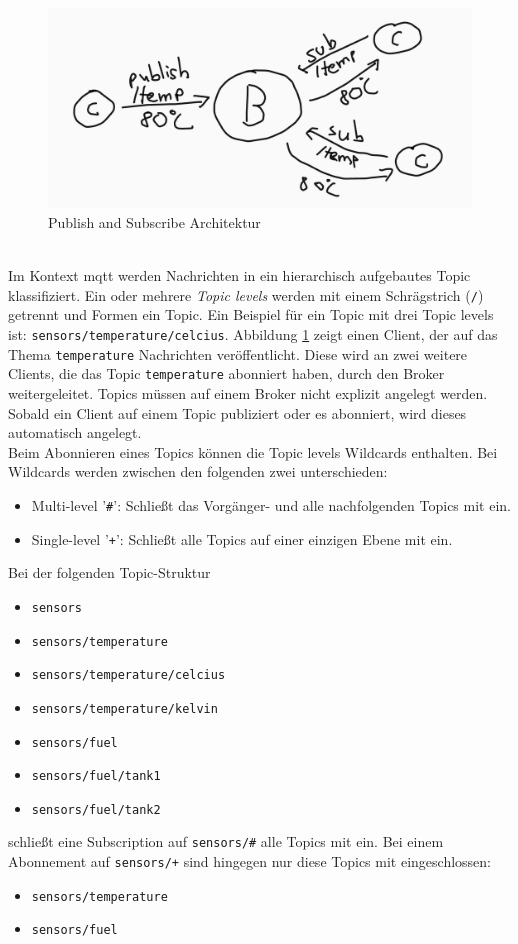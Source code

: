\begin{figure}
    \centering
    \includegraphics[scale=0.5]{images/publish_subscribe.png}
    \caption{Publish and Subscribe Architektur}
    \label{fig:publish-subscribe}
\end{figure}
\\
Im Kontext \ac{mqtt} werden Nachrichten in ein hierarchisch aufgebautes Topic klassifiziert.
Ein oder mehrere \textit{Topic levels} werden mit einem Schrägstrich (\verb|/|) getrennt und Formen ein Topic. Ein Beispiel für ein Topic mit drei Topic levels ist: \verb|sensors/temperature/celcius|.
Abbildung \ref{fig:publish-subscribe} zeigt einen Client, der auf das Thema \verb|temperature| Nachrichten veröffentlicht. Diese wird an zwei weitere Clients, die das Topic \verb|temperature| abonniert haben, durch den Broker weitergeleitet. Topics müssen auf einem Broker nicht explizit angelegt werden. Sobald ein Client auf einem Topic publiziert oder es abonniert, wird dieses automatisch angelegt.\cite{WhatMQTTDefinition}\\
Beim Abonnieren eines Topics können die Topic levels Wildcards enthalten. Bei Wildcards werden zwischen den folgenden zwei unterschieden:\cite{mqtt5Specification}
\begin{itemize}
    \item Multi-level '\verb|#|': Schlie{\ss}t das Vorgänger- und alle nachfolgenden Topics mit ein.
    \item Single-level '\verb|+|': Schlie{\ss}t alle Topics auf einer einzigen Ebene mit ein.
\end{itemize}
Bei der folgenden Topic-Struktur
\begin{itemize}
    \item \verb|sensors|
    \item \verb|sensors/temperature|
    \item \verb|sensors/temperature/celcius|
    \item \verb|sensors/temperature/kelvin|
    \item \verb|sensors/fuel|
    \item \verb|sensors/fuel/tank1|
    \item \verb|sensors/fuel/tank2|
\end{itemize}
schlie{\ss}t eine Subscription auf \verb|sensors/#| alle Topics mit ein. Bei einem Abonnement auf \verb|sensors/+| sind hingegen nur diese Topics mit eingeschlossen:
\begin{itemize}
    \item \verb|sensors/temperature|
    \item \verb|sensors/fuel|
\end{itemize}

